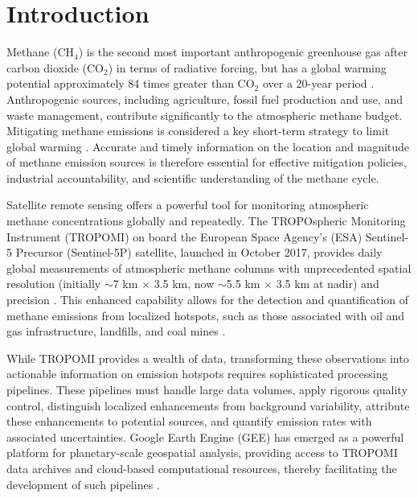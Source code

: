 \documentclass[12pt,a4paper]{article}
\begin{document}
\section{Introduction}
Methane (CH$_4$) is the second most important anthropogenic greenhouse gas after carbon dioxide (CO$_2$) in terms of radiative forcing, but has a global warming potential approximately 84 times greater than CO$_2$ over a 20-year period \citep{IPCCAR6}. Anthropogenic sources, including agriculture, fossil fuel production and use, and waste management, contribute significantly to the atmospheric methane budget. Mitigating methane emissions is considered a key short-term strategy to limit global warming \citep{UNEPGlobalMethane}. Accurate and timely information on the location and magnitude of methane emission sources is therefore essential for effective mitigation policies, industrial accountability, and scientific understanding of the methane cycle.

Satellite remote sensing offers a powerful tool for monitoring atmospheric methane concentrations globally and repeatedly. The TROPOspheric Monitoring Instrument (TROPOMI) on board the European Space Agency's (ESA) Sentinel-5 Precursor (Sentinel-5P) satellite, launched in October 2017, provides daily global measurements of atmospheric methane columns with unprecedented spatial resolution (initially $\sim$7 km $\times$ 3.5 km, now $\sim$5.5 km $\times$ 3.5 km at nadir) and precision \citep{Hu2018TROPOMI}. This enhanced capability allows for the detection and quantification of methane emissions from localized hotspots, such as those associated with oil and gas infrastructure, landfills, and coal mines \citep{Zhang2020Permian, Varon2018}.

While TROPOMI provides a wealth of data, transforming these observations into actionable information on emission hotspots requires sophisticated processing pipelines. These pipelines must handle large data volumes, apply rigorous quality control, distinguish localized enhancements from background variability, attribute these enhancements to potential sources, and quantify emission rates with associated uncertainties. Google Earth Engine (GEE) has emerged as a powerful platform for planetary-scale geospatial analysis, providing access to TROPOMI data archives and cloud-based computational resources, thereby facilitating the development of such pipelines \citep{Gorelick2017GEE}.
\end{document}
